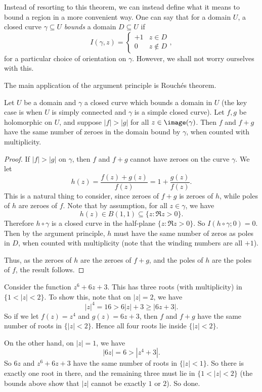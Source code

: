 \documentclass[a4paper]{article}
\begin{document}
Instead of resorting to this theorem, we can instead define what it means to bound a region in a more convenient way. One can say that for a domain $U$, a closed curve $\gamma \subseteq U$ \emph{bounds} a domain $D \subseteq U$ if
\[
  I(\gamma, z) =
  \begin{cases}
    +1 & z \in D\\
    0 & z \not\in D
  \end{cases},
\]
for a particular choice of orientation on $\gamma$. However, we shall not worry ourselves with this.

The main application of the argument principle is Rouch\'es theorem.
\begin{cor}
  Let $U$ be a domain and $\gamma$ a closed curve which bounds a domain in $U$ (the key case is when $U$ is simply connected and $\gamma$ is a simple closed curve). Let $f, g$ be holomorphic on $U$, and suppose $|f| > |g|$ for all $z \in \image(\gamma)$. Then $f$ and $f + g$ have the same number of zeroes in the domain bound by $\gamma$, when counted with multiplicity.
\end{cor}

\begin{proof}
  If $|f| > |g|$ on $\gamma$, then $f$ and $f + g$ cannot have zeroes on the curve $\gamma$. We let
  \[
    h(z) = \frac{f(z) + g(z)}{f(z)} = 1 + \frac{g(z)}{f(z)}.
  \]
  This is a natural thing to consider, since zeroes of $f + g$ is zeroes of $h$, while poles of $h$ are zeroes of $f$. Note that by assumption, for all $z \in \gamma$, we have
  \[
    h(z) \in B(1, 1) \subseteq \{z: \Re z > 0\}.
  \]
  Therefore $h \circ \gamma$ is a closed curve in the half-plane $\{z: \Re z > 0\}$. So $I(h \circ \gamma; 0) = 0$. Then by the argument principle, $h$ must have the same number of zeros as poles in $D$, when counted with multiplicity (note that the winding numbers are all $+1$).

  Thus, as the zeroes of $h$ are the zeroes of $f + g$, and the poles of $h$ are the poles of $f$, the result follows.
\end{proof}

\begin{eg}
  Consider the function $z^6 + 6z + 3$. This has three roots (with multiplicity) in $\{1 < |z| < 2\}$. To show this, note that on $|z| = 2$, we have
  \[
    |z|^4 = 16 > 6|z| + 3 \geq |6z + 3|.
  \]
  So if we let $f(z) = z^4$ and $g(z) = 6z + 3$, then $f$ and $f + g$ have the same number of roots in $\{|z| < 2\}$. Hence all four roots lie inside $\{|z| < 2\}$.

  On the other hand, on $|z| = 1$, we have
  \[
    |6z| = 6 > |z^4 + 3|.
  \]
  So $6z$ and $z^6 + 6z + 3$ have the same number of roots in $\{|z| < 1\}$. So there is exactly one root in there, and the remaining three must lie in $\{1 < |z| < 2\}$ (the bounds above show that $|z|$ cannot be exactly $1$ or $2$). So done.
\end{eg}
\end{document}
